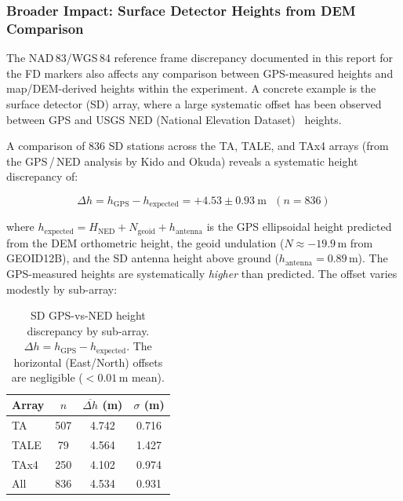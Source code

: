 \documentclass[11pt,letterpaper]{article}
\begin{document}
\subsubsection{Broader Impact: Surface Detector Heights from DEM Comparison}

The NAD\,83/WGS\,84 reference frame discrepancy documented in this report for the FD markers also affects any comparison between GPS-measured heights and map/DEM-derived heights within the experiment. A concrete example is the surface detector (SD) array, where a large systematic offset has been observed between GPS and USGS NED (National Elevation Dataset)~\cite{gesch2002} heights.

A comparison of 836 SD stations across the TA, TALE, and TAx4 arrays (from the GPS\,/\,NED analysis by Kido and Okuda) reveals a systematic height discrepancy of:

\begin{equation}
\Delta h = h_{\text{GPS}} - h_{\text{expected}} = +4.53 \pm 0.93~\text{m}~~~(n = 836)
\label{eq:sd_offset}
\end{equation}

\noindent where $h_{\text{expected}} = H_{\text{NED}} + N_{\text{geoid}} + h_{\text{antenna}}$ is the GPS ellipsoidal height predicted from the DEM orthometric height, the geoid undulation ($N \approx -19.9$\,m from GEOID12B), and the SD antenna height above ground ($h_{\text{antenna}} = 0.89$\,m). The GPS-measured heights are systematically \emph{higher} than predicted. The offset varies modestly by sub-array:

\begin{table}[H]
\centering
\caption{SD GPS-vs-NED height discrepancy by sub-array. $\Delta h = h_{\text{GPS}} - h_{\text{expected}}$. The horizontal (East/North) offsets are negligible ($< 0.01$\,m mean).}
\label{tab:sd_offsets}
\smallskip
\begin{tabular}{@{}lS[table-format=3.0]S[table-format=1.3]S[table-format=1.3]@{}}
\toprule
{Array} & {$n$} & {$\overline{\Delta h}$ (m)} & {$\sigma$ (m)} \\
\midrule
TA   & 507 & 4.742 & 0.716 \\
TALE &  79 & 4.564 & 1.427 \\
TAx4 & 250 & 4.102 & 0.974 \\
\midrule
All  & 836 & 4.534 & 0.931 \\
\bottomrule
\end{tabular}
\end{table}
\end{document}
